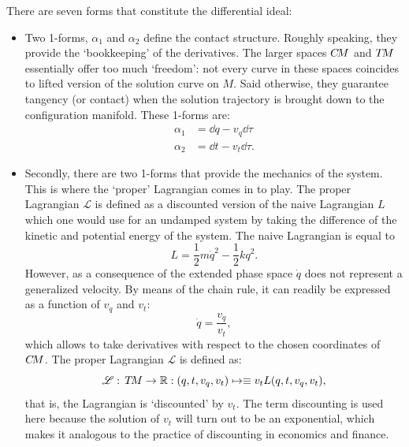 There are seven forms that constitute the differential ideal:
\begin{itemize}
    \item Two 1-forms, $\alpha_1$ and $\alpha_2$ define the contact structure. Roughly speaking, they provide the `bookkeeping' of the derivatives. The larger spaces $C\!M$ and $T\!M$ essentially offer too much `freedom': not every curve in these spaces coincides to lifted version of the solution curve on $M$. Said otherwise, they guarantee tangency (or contact) when the solution trajectory is brought down to the configuration manifold. These 1-forms are:
    \begin{equation} 
        \begin{split}
            \alpha_1 &= \dd{q} - v_q\dd{\tau}\\
            \alpha_2 &= \dd{t} - v_t\dd{\tau}.
        \end{split}
    \end{equation}
    \item Secondly, there are two 1-forms that provide the mechanics of the system. This is where the `proper' Lagrangian comes in to play. The proper Lagrangian $\mathscr{L}$ is defined as a discounted version of the naive Lagrangian $L$ which one would use for an undamped system by taking the difference of the kinetic and potential energy of the system. The naive Lagrangian is equal to $$ L = \frac{1}{2}m\dot{q}^2 - \frac{1}{2}kq^2. $$
    However, as a consequence of the extended phase space $\dot{q}$ does not represent a generalized velocity. By means of the chain rule, it can readily be expressed as a function of $v_q$ and $v_t$:
    $$ \dot{q} = \frac{v_q}{v_t}, $$
    which allows to take derivatives with respect to the chosen coordinates of $C\!M$. The proper Lagrangian $\mathscr{L}$ is defined as:
        $$ \mathscr{L}:\,T\!M\to\mathbb{R} : (q, t, v_q, v_t) \mapsto \equiv v_t L(q, t, v_q, v_t), $$
    that is, the Lagrangian is `discounted' by $v_t$. The term discounting is used here because the solution of $v_t$ will turn out to be an exponential, which makes it analogous to the practice of discounting in economics and finance.
\end{itemize}


